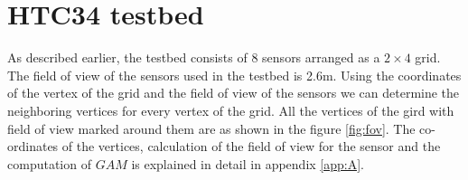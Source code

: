 \section{HTC34 testbed}
As described earlier, the testbed consists of 8 sensors arranged as a $2 \times 4$ grid.
The field of view of the sensors used in the testbed is 2.6m.
Using the coordinates of the vertex of the grid and the field of view of the sensors we can determine the neighboring vertices for every vertex of the grid.
All the vertices of the gird with field of view marked around them are as shown in the figure \ref{fig:fov}. 
The co-ordinates of the vertices, calculation of the field of view for the sensor and the computation of $GAM$ is explained in detail in appendix \ref{app:A}. 




